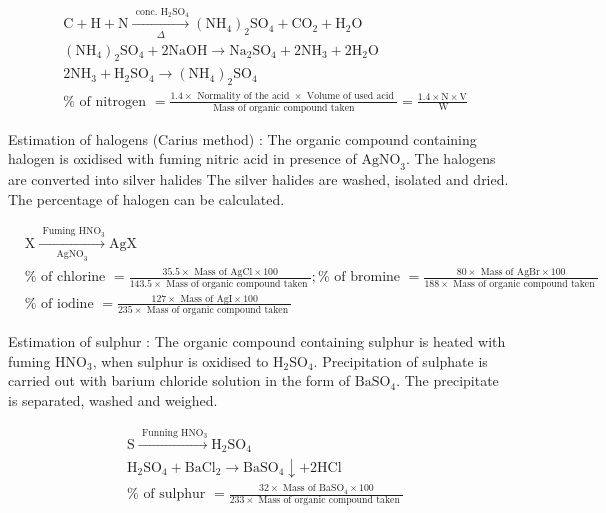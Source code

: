 \documentclass[10pt]{article}
\begin{document}
$$
\begin{aligned}
& \mathrm{C}+\mathrm{H}+\mathrm{N} \xrightarrow[\Delta]{\text { conc. } \mathrm{H}_{2} \mathrm{SO}_{4}}\left(\mathrm{NH}_{4}\right)_{2} \mathrm{SO}_{4}+\mathrm{CO}_{2}+\mathrm{H}_{2} \mathrm{O} \\
& \left(\mathrm{NH}_{4}\right)_{2} \mathrm{SO}_{4}+2 \mathrm{NaOH} \longrightarrow \mathrm{Na}_{2} \mathrm{SO}_{4}+2 \mathrm{NH}_{3}+2 \mathrm{H}_{2} \mathrm{O} \\
& 2 \mathrm{NH}_{3}+\mathrm{H}_{2} \mathrm{SO}_{4} \longrightarrow\left(\mathrm{NH}_{4}\right)_{2} \mathrm{SO}_{4} \\
& \% \text { of nitrogen }=\frac{1.4 \times \text { Normality of the acid } \times \text { Volume of used acid }}{\text { Mass of organic compound taken }}=\frac{1.4 \times \mathrm{N} \times \mathrm{V}}{\mathrm{~W}}
\end{aligned}
$$

Estimation of halogens (Carius method) : The organic compound containing halogen is oxidised with fuming nitric acid in presence of $\mathrm{AgNO}_{3}$. The halogens are converted into silver halides The silver halides are washed, isolated and dried. The percentage of halogen can be calculated.

$$
\begin{aligned}
& \mathrm{X} \xrightarrow[\mathrm{AgNO}_{3}]{\text { Fuming } \mathrm{HNO}_{3}} \mathrm{AgX} \\
& \% \text { of chlorine }=\frac{35.5 \times \text { Mass of } \mathrm{AgCl} \times 100}{143.5 \times \text { Mass of organic compound taken }} ; \% \text { of bromine }=\frac{80 \times \text { Mass of } \mathrm{AgBr} \times 100}{188 \times \text { Mass of organic compound taken }} \\
& \% \text { of iodine }=\frac{127 \times \text { Mass of } \mathrm{AgI} \times 100}{235 \times \text { Mass of organic compound taken }}
\end{aligned}
$$

Estimation of sulphur : The organic compound containing sulphur is heated with fuming $\mathrm{HNO}_{3}$, when sulphur is oxidised to $\mathrm{H}_{2} \mathrm{SO}_{4}$. Precipitation of sulphate is carried out with barium chloride solution in the form of $\mathrm{BaSO}_{4}$. The precipitate is separated, washed and weighed.

$$
\begin{aligned}
& \mathrm{S} \xrightarrow{\text { Funning } \mathrm{HNO}_{3}} \mathrm{H}_{2} \mathrm{SO}_{4} \\
& \mathrm{H}_{2} \mathrm{SO}_{4}+\mathrm{BaCl}_{2} \longrightarrow \mathrm{BaSO}_{4} \downarrow+2 \mathrm{HCl} \\
& \% \text { of sulphur }=\frac{32 \times \text { Mass of } \mathrm{BaSO}_{4} \times 100}{233 \times \text { Mass of organic compound taken }}
\end{aligned}
$$
\end{document}
